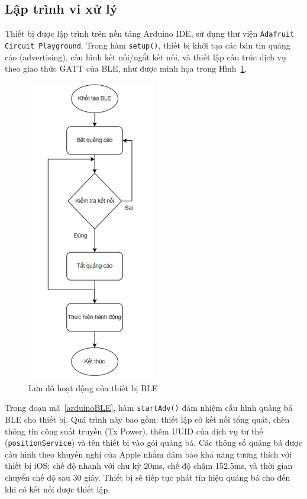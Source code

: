 \subsection{Lập trình vi xử lý}

Thiết bị được lập trình trên nền tảng Arduino IDE, sử dụng thư viện 
\texttt{Adafruit Circuit Playground}. Trong hàm \texttt{setup()}, 
thiết bị khởi tạo các bản tin quảng cáo (advertising), 
cấu hình kết nối/ngắt kết nối, và thiết lập cấu trúc dịch vụ theo 
giao thức \gls{GATT} của BLE, như được minh họa trong Hình~\ref{flowBLE}.

\begin{figure}[htbp]
    \centering
    \includegraphics[width=0.5\textwidth]{images/flowBLE.png}
    \caption{Lưu đồ hoạt động của thiết bị BLE}
    \label{flowBLE}
\end{figure}

Trong đoạn mã~\ref{arduinoBLE}, hàm \texttt{startAdv()} đảm nhiệm cấu 
hình quảng bá BLE cho thiết bị. Quá trình này bao gồm: thiết lập cờ 
kết nối tổng quát, chèn thông tin công suất truyền (Tx Power), 
thêm UUID của dịch vụ tư thế (\texttt{positionService}) và tên thiết 
bị vào gói quảng bá. Các thông số quảng bá được cấu hình theo khuyến 
nghị của Apple nhằm đảm bảo khả năng tương thích với thiết bị iOS: 
chế độ nhanh với chu kỳ 20ms, chế độ chậm 152.5ms, và thời gian chuyển 
chế độ sau 30 giây. Thiết bị sẽ tiếp tục phát tín hiệu quảng bá cho 
đến khi có kết nối được thiết lập.


